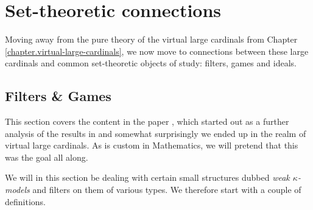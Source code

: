 \documentclass[../../main]{subfiles}
\begin{document}
\chapter{Set-theoretic connections}
\thispagestyle{fancy}

Moving away from the pure theory of the virtual large cardinals from Chapter \ref{chapter.virtual-large-cardinals}, we now move to connections between these large cardinals and common set-theoretic objects of study: filters, games and ideals.

\section{Filters \& Games}

This section covers the content in the paper \cite{NielsenWelch}, which started out as a further analysis of the results in \cite{HolySchlicht} and somewhat surprisingly we ended up in the realm of virtual large cardinals. As is custom in Mathematics, we will pretend that this was the goal all along.

\qquad We will in this section be dealing with certain small structures dubbed \textit{weak $\kappa$-models} and filters on them of various types. We therefore start with a couple of definitions.


\end{document}
